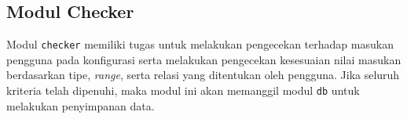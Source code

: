 	\subsection{Modul Checker}
	Modul \texttt{checker} memiliki tugas untuk melakukan pengecekan terhadap masukan pengguna pada konfigurasi serta melakukan pengecekan kesesuaian nilai masukan berdasarkan tipe, \textit{range}, serta relasi yang ditentukan oleh pengguna. Jika seluruh kriteria telah dipenuhi, maka modul ini akan memanggil modul \texttt{db} untuk melakukan penyimpanan data.


